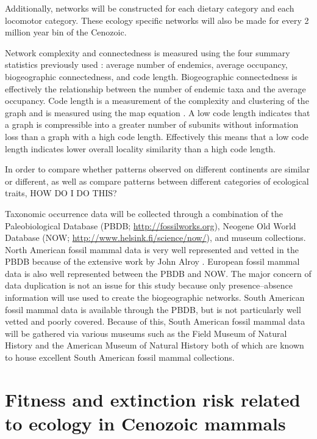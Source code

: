 \documentclass[12pt,letterpaper]{article}
\begin{document}
Additionally, networks will be constructed for each dietary category and each locomotor category. These ecology specific networks will also be made for every 2 million year bin of the Cenozoic.

Network complexity and connectedness is measured using the four summary statistics previously used \citep{Sidor2013}: average number of endemics, average occupancy, biogeographic connectedness, and code length. Biogeographic connectedness is effectively the relationship between the number of endemic taxa and the average occupancy. Code length is a measurement of the complexity and clustering of the graph and is measured using the map equation \citep{Rosvall2008,Rosvall2010b}. A low code length indicates that a graph is compressible into a greater number of subunits without information loss than a graph with a high code length. Effectively this means that a low code length indicates lower overall locality similarity than a high code length.

In order to compare whether patterns observed on different continents are similar or different, as well as compare patterns between different categories of ecological traits, HOW DO I DO THIS?

Taxonomic occurrence data will be collected through a combination of the Paleobiological Database (PBDB; \url{http://fossilworks.org}), Neogene Old World Database (NOW; \url{http://www.helsink.fi/science/now/}), and museum collections. North American fossil mammal data is very well represented and vetted in the PBDB because of the extensive work by John Alroy \citep{Alroy1996a,Alroy1998,Alroy2000g}. European fossil mammal data is also well represented between the PBDB and NOW. The major concern of data duplication is not an issue for this study because only presence--absence information will use used to create the biogeographic networks. South American fossil mammal data is available through the PBDB, but is not particularly well vetted and poorly covered. Because of this, South American fossil mammal data will be gathered via various museums such as the Field Museum of Natural History and the American Museum of Natural History both of which are known to house excellent South American fossil mammal collections.


\section{Fitness and extinction risk related to ecology in Cenozoic mammals}
\end{document}
